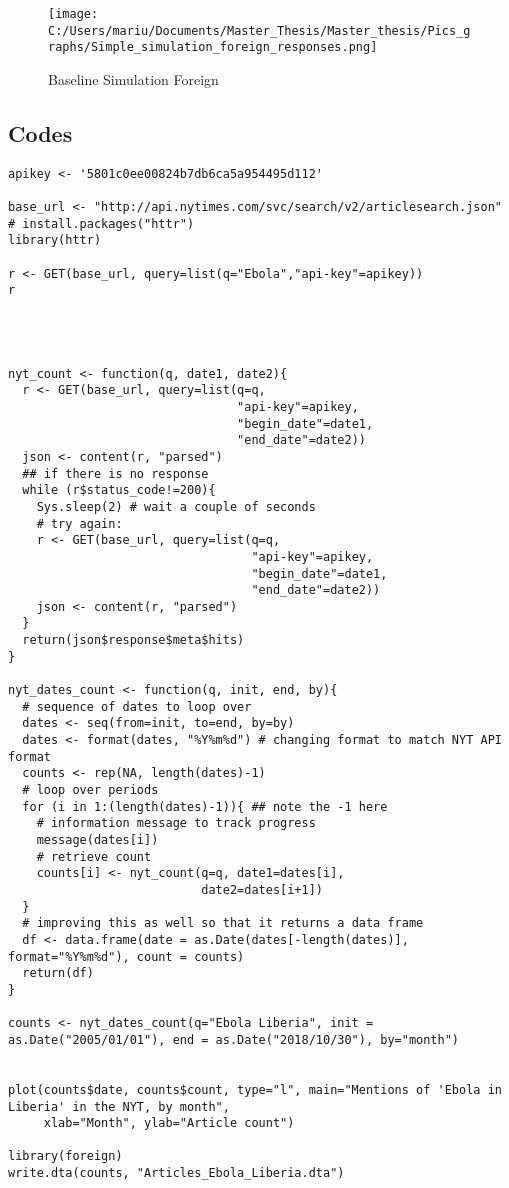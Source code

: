 \documentclass{article}
\begin{document}
\begin{figure}[!ht]
\begin{center}\caption{Baseline Simulation Foreign \label{Baseline Simulation Foreign}}
\texttt{[image: C:/Users/mariu/Documents/Master\_Thesis/Master\_thesis/Pics\_graphs/Simple\_simulation\_foreign\_responses.png]}\\
\end{center}
\end{figure}


\subsection*{Codes}

\newsavebox\myv
\begin{lrbox}{\myv}\begin{minipage}{\textwidth}
\begin{verbatim}
apikey <- '5801c0ee00824b7db6ca5a954495d112'

base_url <- "http://api.nytimes.com/svc/search/v2/articlesearch.json"
# install.packages("httr")
library(httr)

r <- GET(base_url, query=list(q="Ebola","api-key"=apikey))
r




nyt_count <- function(q, date1, date2){
  r <- GET(base_url, query=list(q=q,
                                "api-key"=apikey,
                                "begin_date"=date1,
                                "end_date"=date2))
  json <- content(r, "parsed")
  ## if there is no response
  while (r$status_code!=200){
    Sys.sleep(2) # wait a couple of seconds
    # try again:
    r <- GET(base_url, query=list(q=q,
                                  "api-key"=apikey,
                                  "begin_date"=date1,
                                  "end_date"=date2))
    json <- content(r, "parsed")
  }
  return(json$response$meta$hits)
}

nyt_dates_count <- function(q, init, end, by){
  # sequence of dates to loop over
  dates <- seq(from=init, to=end, by=by)
  dates <- format(dates, "%Y%m%d") # changing format to match NYT API format
  counts <- rep(NA, length(dates)-1)
  # loop over periods
  for (i in 1:(length(dates)-1)){ ## note the -1 here
    # information message to track progress
    message(dates[i])
    # retrieve count
    counts[i] <- nyt_count(q=q, date1=dates[i],
                           date2=dates[i+1])
  }
  # improving this as well so that it returns a data frame
  df <- data.frame(date = as.Date(dates[-length(dates)], format="%Y%m%d"), count = counts)
  return(df)
}

counts <- nyt_dates_count(q="Ebola Liberia", init = as.Date("2005/01/01"), end = as.Date("2018/10/30"), by="month")


plot(counts$date, counts$count, type="l", main="Mentions of 'Ebola in Liberia' in the NYT, by month",
     xlab="Month", ylab="Article count")

library(foreign)
write.dta(counts, "Articles_Ebola_Liberia.dta")
\end{verbatim}
\end{minipage}\end{lrbox}
\end{document}
